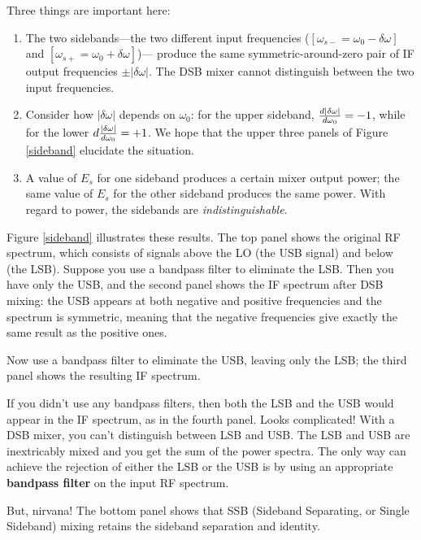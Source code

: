 \documentclass[12pt,preprint]{aastex}
\begin{document}
        Three things are important here: \begin{enumerate}

        \item The two sidebands---the two different input
frequencies ($[\omega_{s-}= \omega_0 - \delta \omega]$ and $[\omega_{s+}=
\omega_0 + \delta \omega]$)--- produce the same
symmetric-around-zero pair of IF output frequencies $\pm |\delta
\omega|$. The DSB mixer
cannot distinguish between the two input frequencies.

        \item Consider how $|\delta \omega|$ depends on $\omega_0$: for
          the upper sideband, ${d |\delta \omega| \over d\omega_0} = -1$,
          while for the lower $d {|\delta \omega| \over d\omega_0} =
          +1$. We hope that the upper three panels of Figure
          \ref{sideband} elucidate the situation.

        \item A value of $E_s$ for one sideband produces a certain mixer
output power; the same value of $E_s$ for the other sideband
produces the same power. With regard to power, the sidebands are {\it
indistinguishable}.

\end{enumerate}
%
Figure \ref{sideband} illustrates these results. The top panel shows the
original RF spectrum, which consists of signals above the LO (the USB
signal) and below (the LSB). Suppose you use a bandpass filter to
eliminate the LSB. Then you have only the USB, and the second panel
shows the IF spectrum after DSB mixing: the USB appears at both negative
and positive frequencies and the spectrum is symmetric, meaning that the
negative frequencies give exactly the same result as the positive ones.

Now use a bandpass filter to eliminate the USB, leaving only the LSB;
the third panel shows the resulting IF spectrum.

If you didn't use any bandpass filters, then both the LSB and the USB
would appear in the IF spectrum, as in the fourth panel. Looks
complicated! With a DSB mixer, you can't distinguish between LSB and
USB. The LSB and USB are inextricably
mixed and you get the sum of the power spectra. 
The only way can achieve the rejection of either the LSB or the USB is by
using an appropriate {\bf bandpass filter} on the input RF spectrum. 

But, nirvana! The bottom panel shows that SSB (Sideband Separating, or
Single Sideband) mixing retains the sideband separation and identity.
\end{document}
